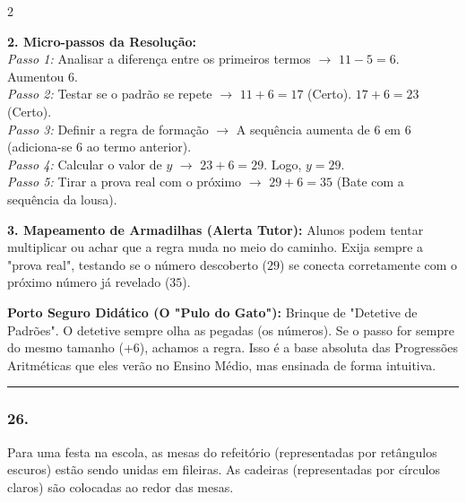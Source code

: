 \begin{multicols*}{2}
\begin{tcolorbox}[colback=CorTitUm!5, colframe=CorTitUm, boxrule=1pt, arc=4pt, left=6pt, right=6pt, top=6pt, bottom=6pt]
    \textbf{2. Micro-passos da Resolução:}\\
    \textit{Passo 1:} Analisar a diferença entre os primeiros termos $\rightarrow$ $11 - 5 = 6$. Aumentou 6.\\
    \textit{Passo 2:} Testar se o padrão se repete $\rightarrow$ $11 + 6 = 17$ (Certo). $17 + 6 = 23$ (Certo).\\
    \textit{Passo 3:} Definir a regra de formação $\rightarrow$ A sequência aumenta de 6 em 6 (adiciona-se 6 ao termo anterior).\\
    \textit{Passo 4:} Calcular o valor de $y$ $\rightarrow$ $ 23 + 6 = 29 $. Logo, $y = 29$.\\
    \textit{Passo 5:} Tirar a prova real com o próximo $\rightarrow$ $29 + 6 = 35$ (Bate com a sequência da lousa).\par\vspace{0.1cm}
    
    \textbf{3. Mapeamento de Armadilhas (Alerta Tutor):} Alunos podem tentar multiplicar ou achar que a regra muda no meio do caminho. Exija sempre a "prova real", testando se o número descoberto ($29$) se conecta corretamente com o próximo número já revelado ($35$).
    \end{tcolorbox}
    \vspace{0.15cm}
    
    \begin{boxexplicacao}
    \textbf{Porto Seguro Didático (O "Pulo do Gato"):} Brinque de "Detetive de Padrões". O detetive sempre olha as pegadas (os números). Se o passo for sempre do mesmo tamanho (+6), achamos a regra. Isso é a base absoluta das Progressões Aritméticas que eles verão no Ensino Médio, mas ensinada de forma intuitiva.
    \end{boxexplicacao}
\fi

\par\vspace{\espacoQuestao}

\noindent\textcolor{CorLinha}{\rule{\linewidth}{0.5pt}} 
\par\vspace{\espacoPreQuestao}
\subsubsection*{26.} 
\begin{enunciadoLiteral}
Para uma festa na escola, as mesas do refeitório (representadas por retângulos escuros) estão sendo unidas em fileiras. As cadeiras (representadas por círculos claros) são colocadas ao redor das mesas. 


\end{enunciadoLiteral}
\end{multicols*}
